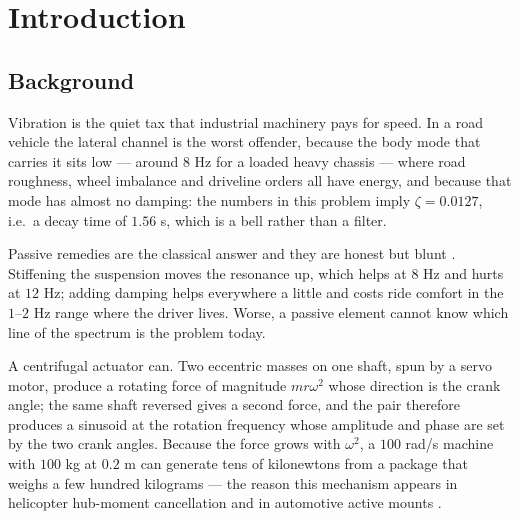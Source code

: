 \documentclass[12pt]{apmcmthesis}
\begin{document}
\begin{abstract}
\textbf{Validation and Limitation} The force was verified to $0.3^\circ$ in phase and the transfer
function to $2.5\%$ in magnitude; doubling and quadrupling the passive damping only reaches
$4\,897.3$ and $1\,447.0$. The dominant limitation is phase: a $6^\circ$ command error raises the
index from $11.778$ to $128.98$, and a $10$ ms transport delay lifts the closed loop to $3\,323.5$. The learned
controller adds two of its own: its corpus is synthetic, built from three measured statistics of the
official record, so it is accurate there but not proof of generalisation; and it is a model
inversion, degrading to $9\,964.7$ at $c-50\%$, which is why the model-based trim is kept.

\end{abstract}

\newpage
\setcounter{tocdepth}{1}
\tableofcontents
\newpage
\pagestyle{mainmatterstyle}
\setcounter{page}{1}

\section{Introduction}
\subsection{Background}
Vibration is the quiet tax that industrial machinery pays for speed. In a road vehicle the
lateral channel is the worst offender, because the body mode that carries it sits low --- around
$8$ Hz for a loaded heavy chassis --- where road roughness, wheel imbalance and driveline orders
all have energy, and because that mode has almost no damping: the numbers in this problem imply
$\zeta=0.0127$, i.e.\ a decay time of $1.56$ s, which is a bell rather than a filter.

Passive remedies are the classical answer and they are honest but blunt
\cite{denhartog}. Stiffening the suspension moves the resonance up, which helps at $8$ Hz and
hurts at $12$ Hz; adding damping helps everywhere a little and costs ride comfort in the
$1$--$2$ Hz range where the driver lives. Worse, a passive element cannot know which line of the
spectrum is the problem today.

A centrifugal actuator can. Two eccentric masses on one shaft, spun by a servo motor, produce a
rotating force of magnitude $mr\omega^2$ whose direction is the crank angle; the same shaft
reversed gives a second force, and the pair therefore produces a sinusoid at the rotation
frequency whose amplitude and phase are set by the two crank angles. Because the force grows with
$\omega^2$, a $100$ rad/s machine with $100$ kg at $0.2$ m can generate tens of kilonewtons from a
package that weighs a few hundred kilograms --- the reason this mechanism appears in
helicopter hub-moment cancellation \cite{song2021,you2013} and in automotive active mounts
\cite{hu2023}.
\end{document}

